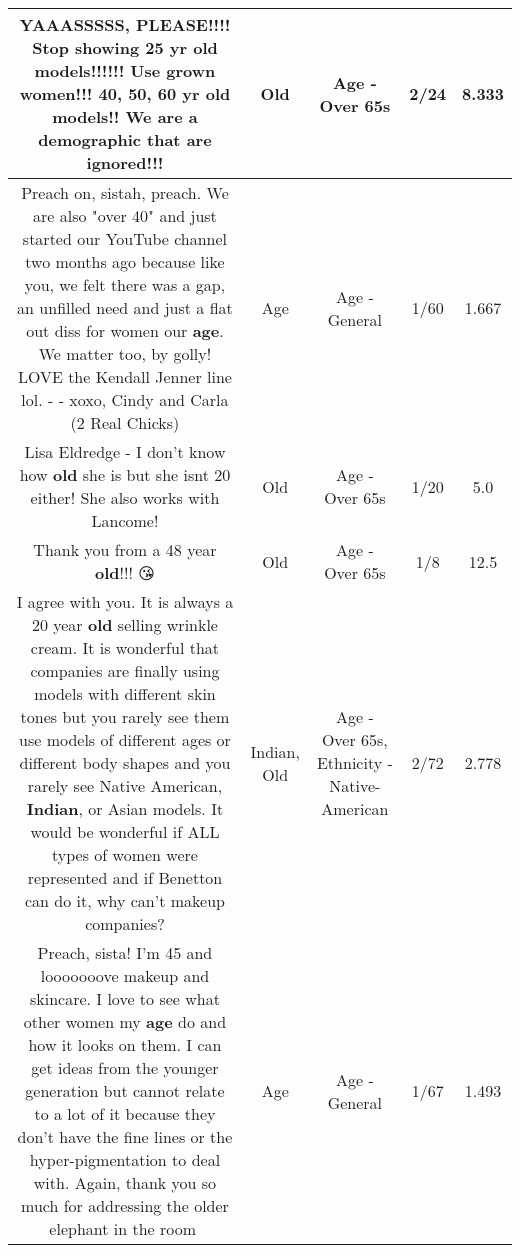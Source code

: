 \documentclass[11pt]{article}
\newlength\mylength
\begin{document}
\begin{center}
\begin{longtable}{|C{.65\mylength}|C{.30\mylength}|C{.12\mylength}|C{.12\mylength}|C{.12\mylength}|}
  \small YAAASSSSS, PLEASE!!!! Stop showing 25 yr \textbf{old} models!!!!!! Use grown women!!! 40, 50, 60 yr \textbf{old} models!! We are a demographic that are ignored!!!\normalsize   & Old & Age - Over 65s & 2/24 & 8.333 \\  \hline
  \small Preach on, sistah, preach. We are also "over 40" and just started our YouTube channel two months ago because like you, we felt there was a gap, an unfilled need and just a flat out diss for women our \textbf{age}. We matter too, by golly! LOVE the Kendall Jenner line lol. - - xoxo, Cindy and Carla (2 Real Chicks)\normalsize   & Age & Age - General & 1/60 & 1.667 \\  \hline
  \small Lisa Eldredge - I don't know how \textbf{old} she is but she isnt 20 either!  She also works with Lancome!\normalsize   & Old & Age - Over 65s & 1/20 & 5.0 \\  \hline
  \small Thank you from a 48 year \textbf{old}!!! 😘\normalsize   & Old & Age - Over 65s & 1/8 & 12.5 \\  \hline
  \small I agree with you. It is always a 20 year \textbf{old} selling wrinkle cream. It is wonderful that companies are finally using models with different skin tones but you rarely see them use models of different ages or different body shapes and you rarely see Native American, \textbf{Indian}, or Asian models. It would be wonderful if ALL types of women were represented and if Benetton can do it, why can't makeup companies?\normalsize   & Indian, Old & Age - Over 65s, Ethnicity - Native-American & 2/72 & 2.778 \\  \hline
  \small Preach, sista! I'm 45 and looooooove makeup and skincare. I love to see what other women my \textbf{age} do and how it looks on them. I can get ideas from the younger generation but cannot relate to a lot of it because they don't have the fine lines or the hyper-pigmentation to deal with. Again, thank you so much for addressing the older elephant in the room😬\normalsize   & Age & Age - General & 1/67 & 1.493 \\  \hline

\end{longtable}
\end{center}
\end{document}
